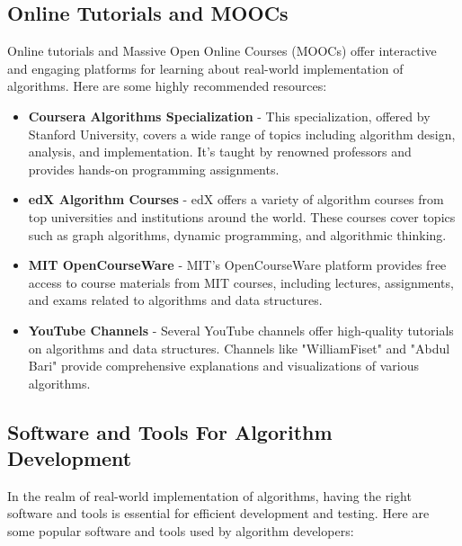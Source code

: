 \documentclass[12pt]{book} %
\begin{document}
\subsection{Online Tutorials and MOOCs}

Online tutorials and Massive Open Online Courses (MOOCs) offer interactive and engaging platforms for learning about real-world implementation of algorithms. Here are some highly recommended resources:

\begin{itemize}
    \item \textbf{Coursera Algorithms Specialization} - This specialization, offered by Stanford University, covers a wide range of topics including algorithm design, analysis, and implementation. It's taught by renowned professors and provides hands-on programming assignments.
    
    \item \textbf{edX Algorithm Courses} - edX offers a variety of algorithm courses from top universities and institutions around the world. These courses cover topics such as graph algorithms, dynamic programming, and algorithmic thinking.
    
    \item \textbf{MIT OpenCourseWare} - MIT's OpenCourseWare platform provides free access to course materials from MIT courses, including lectures, assignments, and exams related to algorithms and data structures.
    
    \item \textbf{YouTube Channels} - Several YouTube channels offer high-quality tutorials on algorithms and data structures. Channels like "WilliamFiset" and "Abdul Bari" provide comprehensive explanations and visualizations of various algorithms.
\end{itemize}

\subsection{Software and Tools For Algorithm Development}

In the realm of real-world implementation of algorithms, having the right software and tools is essential for efficient development and testing. Here are some popular software and tools used by algorithm developers:
\end{document}
